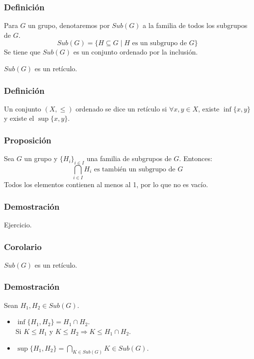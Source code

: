 \documentclass[11pt,a4paper]{article}
\begin{document}
\subsubsection*{Definición}

Para $G$ un grupo, denotaremos por  $Sub(G)$ a la familia de todos los subgrupos de $G$.
$$Sub(G) = \{H \subseteq G \mid H \text{ es un subgrupo de } G\}$$
Se tiene que $Sub(G)$ es un conjunto ordenado por la inclusión.

$Sub(G)$ es un retículo.

\subsubsection*{Definición}

Un conjunto $(X, \leq)$ ordenado se dice un retículo si $\forall x, y \in X$, existe $\inf\{x,y\}$ y existe el $\sup\{x,y\}$.

\subsubsection*{Proposición}

Sea $G$ un grupo y $\{H_{i}\}_{i \in I}$ una familia de subgrupos de $G$. Entonces:
$$\bigcap\limits_{i \in I} H_{i} \text{ es también un subgrupo de } G$$
Todos los elementos contienen al menos al 1, por lo que no es vacío.

\subsubsection*{Demostración}

Ejercicio.

\subsubsection*{Corolario}

$Sub(G)$ es un retículo.

\subsubsection*{Demostración}

Sean $H_{1}, H_{2} \in Sub(G)$.
\begin{itemize}
\item $\inf\{H_{1}, H_{2}\} = H_{1} \cap H_{2}$. \\
Si $K \leqslant H_{1}$ y $K \leqslant H_{2} \Rightarrow K \leqslant H_{1} \cap H_{2}$.
\item $\sup\{H_{1}, H_{2}\} = \bigcap\limits_{K \in Sub(G)} K \in Sub(G)$.
\end{itemize}
\end{document}
